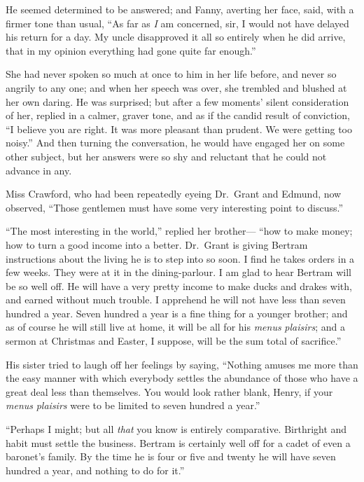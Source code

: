 \documentclass{article}
\begin{document}
He seemed determined to be answered; and Fanny,
averting her face, said, with a firmer tone than usual,
``As far as \emph{I} am concerned, sir, I would not have
delayed his return for a day.  My uncle disapproved it
all so entirely when he did arrive, that in my opinion
everything had gone quite far enough.''

She had never spoken so much at once to him in her life before,
and never so angrily to any one; and when her speech was over,
she trembled and blushed at her own daring.  He was surprised;
but after a few moments' silent consideration of her,
replied in a calmer, graver tone, and as if the candid
result of conviction, ``I believe you are right.  It was
more pleasant than prudent.  We were getting too noisy.''
And then turning the conversation, he would have engaged
her on some other subject, but her answers were so shy
and reluctant that he could not advance in any.

Miss Crawford, who had been repeatedly eyeing Dr.\ Grant
and Edmund, now observed, ``Those gentlemen must have
some very interesting point to discuss.''

``The most interesting in the world,'' replied her brother---%
``how to make money; how to turn a good income into a better.
Dr.\ Grant is giving Bertram instructions about the living
he is to step into so soon.  I find he takes orders
in a few weeks.  They were at it in the dining-parlour.
I am glad to hear Bertram will be so well off.  He will
have a very pretty income to make ducks and drakes with,
and earned without much trouble.  I apprehend he will
not have less than seven hundred a year.  Seven hundred
a year is a fine thing for a younger brother; and as of
course he will still live at home, it will be all for his
\emph{menus} \emph{plaisirs}; and a sermon at Christmas and Easter,
I suppose, will be the sum total of sacrifice.''

His sister tried to laugh off her feelings by saying,
``Nothing amuses me more than the easy manner with which everybody
settles the abundance of those who have a great deal less
than themselves.  You would look rather blank, Henry, if your
\emph{menus} \emph{plaisirs} were to be limited to seven hundred a year.''

``Perhaps I might; but all \emph{that} you know is
entirely comparative.  Birthright and habit must settle
the business.  Bertram is certainly well off for a cadet
of even a baronet's family.  By the time he is four or five
and twenty he will have seven hundred a year, and nothing to do for
it.''
\end{document}
